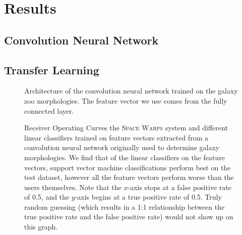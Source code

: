 \documentclass[10pt,twocolumn,letterpaper]{article}
\begin{document}
\section{Results}


\subsection{Convolution Neural Network}


\subsection{Transfer Learning}

\begin{figure}%
\centering
{}
\caption{Architecture of the convolution
  neural network trained on the galaxy zoo morphologies. The feature vector we
use comes from the fully connected layer.}
\label{fig:ryan_architecture}
\end{figure}

\begin{figure*}%
\begin{minipage}[b]{0.48\linewidth}
\centering{}
\end{minipage} \hfill
\begin{minipage}[b]{0.48\linewidth}
\centering{}
\end{minipage} \hfill
  \caption{Receiver Operating Curves the \textsc{Space Warps} system and
    different linear classifiers trained on feature vectors extracted from a
    convolution neural network originally used to determine galaxy
  morphologies. We find that of the linear classifiers on the feature vectors,
support vector machine classifications perform best on the test dataset,
however all the feature vectors perform worse than the users themselves. Note
that the $x$-axis stops at a false positive rate of 0.5, and the $y$-axis
begins at a true positive rate of 0.5. Truly random guessing (which results in
a 1:1 relationship between the true positive rate and the false positive rate)
would not show up on this graph.}
\label{fig:roc_tl} 
\end{figure*}
\end{document}
